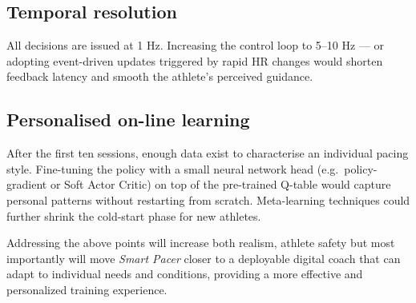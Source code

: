 \subsection{Temporal resolution}
All decisions are issued at 1 Hz. Increasing the control loop to 5–10 Hz — or adopting event-driven updates triggered by rapid HR changes would shorten feedback latency and smooth the athlete's perceived guidance.

\subsection{Personalised on-line learning}
After the first ten sessions, enough data exist to characterise an individual pacing style.  Fine-tuning the policy with a small neural network head (e.g.\ policy-gradient or Soft Actor Critic) on top of the pre-trained Q-table would capture personal patterns without restarting from scratch.  
Meta-learning techniques could further shrink the cold-start phase for new athletes.


\bigskip
Addressing the above points will increase both realism, athlete safety but most importantly will move \emph{Smart Pacer} closer to a deployable digital coach that can adapt to individual needs and conditions, providing a more effective and personalized training experience.